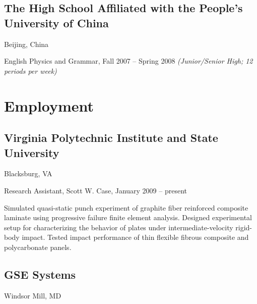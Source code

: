 \documentclass[10pt,letterpaper]{article}
\def\vpisu{Virginia Polytechnic Institute and State University}
\renewenvironment{itemize}{
  \begin{list}{}{
    \setlength{\leftmargin}{30pt}
    \setlength{\itemsep}{0.2em}
    \setlength{\parskip}{0pt}
    \setlength{\parsep}{0.25em}
  }
}{
  \end{list}
}
\begin{document}
\subsection*{The High School Affiliated with the People's University of China}
Beijing, China

\begin{itemize}
\item English Physics and Grammar, Fall 2007 -- Spring 2008
  \emph{(Junior/Senior High; 12 periods per week)}
\end{itemize}

\section*{Employment}

\titleformat{\subsection}[runin]{\large \it}{}{0pt}{}[\hfill\ ]

\subsection*{\vpisu}
Blacksburg, VA

\begin{itemize}
\item Research Assistant, Scott W. Case, January 2009 -- present
  \begin{itemize}
  \item Simulated quasi-static punch experiment of graphite fiber reinforced
    composite laminate using progressive failure finite element analysis.
    Designed experimental setup for characterizing the behavior of plates under
    intermediate-velocity rigid-body impact.  Tested impact performance of thin
    flexible fibrous composite and polycarbonate panels.
  \end{itemize}
\end{itemize}

\subsection*{GSE Systems}
Windsor Mill, MD
\end{document}
